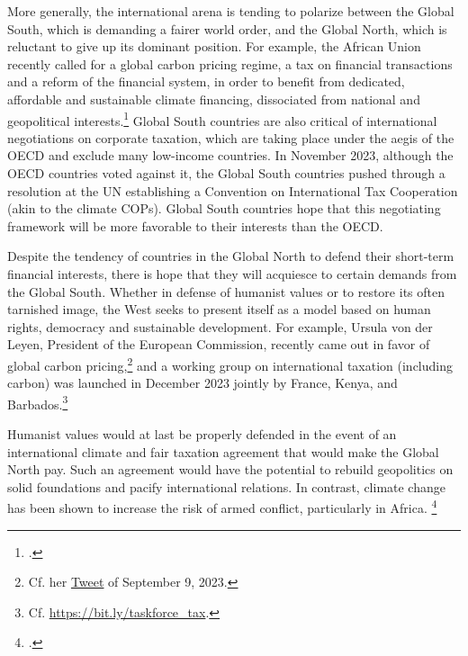 \documentclass[a5paper,english,openany]{memoir}
\begin{document}
More generally, the international arena is tending to polarize %
between the Global South, %
which is demanding a fairer world order, and the Global North, %
which is reluctant to give up its dominant position. For example, the African Union recently called for a global carbon pricing regime, a tax on financial transactions and a reform of the financial system, in order to benefit from dedicated, affordable and sustainable climate financing, dissociated from national and geopolitical interests.\footnote{\citet{african_union_african_2023}.} Global South countries are also critical of international negotiations on corporate taxation, which are taking place under the aegis of the OECD and exclude many low-income countries. In November 2023, although the OECD countries voted against it, the Global South countries pushed through a resolution at the UN establishing a Convention on International Tax Cooperation (akin to the climate COPs). Global South countries hope that this negotiating framework will be more favorable %
to their interests than the OECD. 

Despite the tendency of countries in the Global North %
to defend their short-term financial interests, there is hope that they will acquiesce %
to certain demands from the  Global South. %
Whether in defense %
of humanist values or to restore its often tarnished image, 
the West seeks to present itself as a model based on human rights, democracy and sustainable development. 
For example, Ursula von der Leyen, President of the European Commission, recently came out in favor %
of global carbon pricing,\footnote{Cf. her \href{https://twitter.com/vonderleyen/status/1700416700238225659}{Tweet} of September 9, 2023.} %
and a working group on international taxation (including carbon) was launched in December 2023 jointly by France, Kenya, %
and Barbados.\footnote{Cf. \href{https://www.elysee.fr/admin/upload/default/0001/15/91b013291db03bcc5f2f6b84de39a81ae0c04c7d.pdf}{https://bit.ly/taskforce\_tax}.}

Humanist values would at last be properly defended in the event of an international climate and fair taxation agreement that would make the Global North pay. Such an agreement would have the potential to rebuild geopolitics on solid %
foundations and pacify international relations. In contrast, climate change has been shown to increase the risk of armed conflict, particularly in Africa.%
\footnote{\citet{burke_warming_2009,eberle_heat_2020}.}
\end{document}
